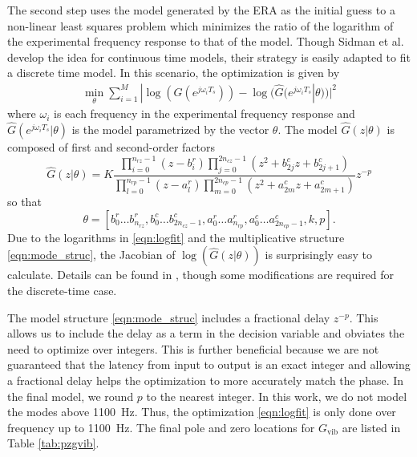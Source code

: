 \documentclass[twocolumn,twoside]{IEEEtran}
\newcommand{\Gv}{\ensuremath{G_{\text{vib}}}\xspace}
\begin{document}
The second step uses the model generated by the ERA as the initial guess to a non-linear least squares problem \cite{sidman_parametric_1991} which minimizes the ratio of the logarithm of the experimental frequency response to that of the model. Though Sidman et al. develop the idea for continuous time models, their strategy is easily adapted to fit a discrete time model. In this scenario, the optimization is given by
\begin{align}
\min_{\theta} \sum_{i=1}^M| \log(G(e^{j\omega_iT_s})) - \log(\hat{G}(e^{j\omega_iT_s}|\theta))|^2
\label{eqn:logfit}
\end{align}
where $\omega_i$ is each frequency in the experimental frequency response and $\hat{G}(e^{j\omega_iT_s}|\theta)$ is the model parametrized by the vector $\theta$. The model $\hat{G}(z|\theta)$ is composed of first and second-order factors
\begin{equation}
  \hat{G}(z|\theta) =K \frac{\prod_{i=0}^{n_{rz}-1} (z-b^r_i) \prod_{j=0}^{2n_{cz}-1}(z^2 +b^c_{2j}z + b^c_{2j+1})}
  { \prod_{l=0}^{n_{rp}-1}(z-a^r_l) \prod_{m=0}^{2n_{cp}-1}(z^2 +a^c_{2m}z + a^c_{2m+1})}z^{-p} \label{eqn:mode_struc}
\end{equation}
so that
\begin{equation}
\theta = [b^r_0\dots b^r_{n_{rz}}, b^c_{0}\dots b^c_{2n_{cz}-1}, a^r_0\dots a^r_{n_{rp}}, a^c_{0}\dots a^c_{2n_{cp}-1}, k, p].
\end{equation}
Due to the logarithms in \eqref{eqn:logfit} and the multiplicative structure \eqref{eqn:mode_struc}, the Jacobian of $\log(\hat{G}(z|\theta))$ is surprisingly easy to calculate. Details can be found in \cite{sidman_parametric_1991}, though some modifications are required for the discrete-time case.

The model structure \eqref{eqn:mode_struc} includes a fractional delay $z^{-p}$. This allows us to include the delay as a term in the decision variable and obviates the need to optimize over integers. This is further beneficial because we are not guaranteed that the latency from input to output is an exact integer and allowing a fractional delay helps the optimization to more accurately match the phase. In the final model, we round $p$ to the nearest integer. In this work, we do not model the modes above 1100~Hz. Thus, the optimization \eqref{eqn:logfit} is only done over frequency up to 1100~Hz. The final pole and zero locations for $\Gv$ are listed in Table \ref{tab:pzgvib}.
\end{document}

